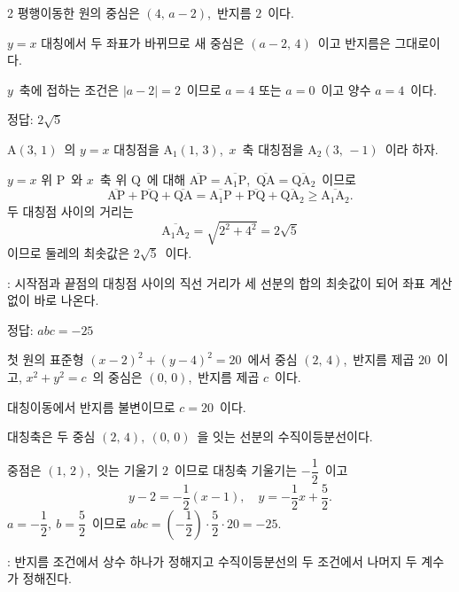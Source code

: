 \documentclass[10pt,fleqn]{article}
\begin{document}
\begin{multicols*}{2}
평행이동한 원의 중심은 $(4,\, a - 2)$,\ 반지름 $2$\ 이다.

$y = x$ 대칭에서 두 좌표가 바뀌므로 새 중심은 $(a - 2,\, 4)$\ 이고 반지름은 그대로이다.

$y$\ 축에 접하는 조건은 $|a - 2| = 2$\ 이므로 $a = 4$ 또는 $a = 0$\ 이고 양수 $a = 4$\ 이다.
\begin{dmanswerbox}
정답: $2\sqrt{5}$
\end{dmanswerbox}

$\mathrm{A}(3,\, 1)$\ 의 $y = x$ 대칭점을 $\mathrm{A}_1(1,\, 3)$,\ $x$\ 축 대칭점을 $\mathrm{A}_2(3,\, -1)$\ 이라 하자.

$y = x$ 위 $\mathrm{P}$\ 와 $x$\ 축 위 $\mathrm{Q}$\ 에 대해 $\overline{\mathrm{AP}} = \overline{\mathrm{A}_1 \mathrm{P}}$,\ $\overline{\mathrm{QA}} = \overline{\mathrm{Q} \mathrm{A}_2}$\ 이므로
\[ \overline{\mathrm{AP}} + \overline{\mathrm{PQ}} + \overline{\mathrm{QA}} = \overline{\mathrm{A}_1 \mathrm{P}} + \overline{\mathrm{PQ}} + \overline{\mathrm{Q} \mathrm{A}_2} \ge \overline{\mathrm{A}_1 \mathrm{A}_2}. \]
두 대칭점 사이의 거리는
\[ \overline{\mathrm{A}_1 \mathrm{A}_2} = \sqrt{2^2 + 4^2} = 2\sqrt{5} \]
이므로 둘레의 최솟값은 $2\sqrt{5}$\ 이다.

\begin{dmcriticalpoint}
: 시작점과 끝점의 대칭점 사이의 직선 거리가 세 선분의 합의 최솟값이 되어 좌표 계산 없이 바로 나온다.
\end{dmcriticalpoint}

\begin{dmanswerbox}
정답: $abc=-25$
\end{dmanswerbox}

첫 원의 표준형 $(x - 2)^2 + (y - 4)^2 = 20$\ 에서 중심 $(2,\, 4)$,\ 반지름 제곱 $20$\ 이고, $x^2 + y^2 = c$\ 의 중심은 $(0,\, 0)$,\ 반지름 제곱 $c$\ 이다.

대칭이동에서 반지름 불변이므로 $c = 20$\ 이다.

대칭축은 두 중심 $(2,\, 4),\ (0,\, 0)$\ 을 잇는 선분의 수직이등분선이다.

중점은 $(1,\, 2)$,\ 잇는 기울기 $2$\ 이므로 대칭축 기울기는 $-\dfrac{1}{2}$\ 이고
\[ y - 2 = -\dfrac{1}{2}(x - 1),\quad y = -\dfrac{1}{2}x + \dfrac{5}{2}. \]
$a = -\dfrac{1}{2},\ b = \dfrac{5}{2}$\ 이므로 $abc = \left(-\dfrac{1}{2}\right)\!\cdot\!\dfrac{5}{2}\!\cdot\!20 = -25$.

\begin{dmcriticalpoint}
: 반지름 조건에서 상수 하나가 정해지고 수직이등분선의 두 조건에서 나머지 두 계수가 정해진다.
\end{dmcriticalpoint}

\end{multicols*}
\end{document}
